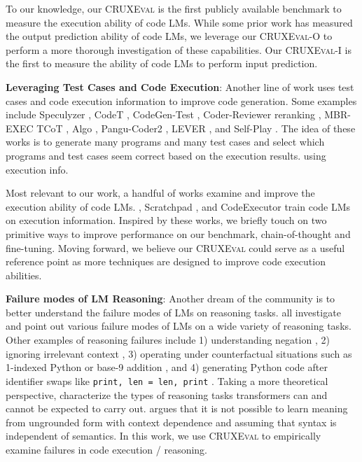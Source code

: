 \documentclass{article} %
\newcommand{\benchmark}{\textsc{CRUXEval}\xspace}
\newcommand{\benchmarki}{\textsc{CRUXEval-I}\xspace}
\newcommand{\benchmarko}{\textsc{CRUXEval-O}\xspace}
\begin{document}
To our knowledge, our \benchmark is the first publicly available benchmark to measure the execution ability of code LMs. While some prior work has measured the output prediction ability of code LMs, we leverage our \benchmarko to perform a more thorough investigation of these capabilities. Our \benchmarki is the first to measure the ability of code LMs to perform input prediction.

\textbf{Leveraging Test Cases and Code Execution}: Another line of work uses test cases and code execution information to improve code generation. Some examples include Speculyzer \citep{key2022speak}, CodeT \citep{chen2022codet}, CodeGen-Test \citep{zhong2022codegen}, Coder-Reviewer reranking \citep{zhang2023coder}, MBR-EXEC \citep{shi2022natural}
TCoT \citep{tian2023test},
Algo \citep{zhang2023algo}, Pangu-Coder2 \citep{shen2023pangu}, LEVER \cite{ni2023lever}, and Self-Play \citep{haluptzok2022language}.
The idea of these works is to generate many programs and many test cases and select which programs and test cases seem correct based on the execution results. 
using execution info. 

Most relevant to our work, a handful of works examine and improve the execution ability of code LMs. \cite{austin2021program}, 
Scratchpad \citep{nye2021show}, and CodeExecutor \citep{liu2023code} train code LMs on execution information. Inspired by these works, we briefly touch on two primitive ways to improve performance on our benchmark, chain-of-thought and fine-tuning. Moving forward, we believe our \benchmark could serve as a useful reference point as more techniques are designed to improve code execution abilities.

\textbf{Failure modes of LM Reasoning}: Another dream of the community is to better understand the failure modes of LMs on reasoning tasks. \cite{bubeck2023sparks, liu2023evaluating, arkoudas2023gpt, zhang2022paradox, dziri2023faith, olausson2023linc, lee2023teaching, zhang2023can} all investigate and point out various failure modes of LMs on a wide variety of reasoning tasks. Other examples of reasoning failures include 1) understanding negation \citep{hosseini2021understanding}, 2) ignoring irrelevant context \citep{shi2023large}, 3) operating under counterfactual situations such as 1-indexed Python or base-9 addition \citep{wu2023reasoning}, and 4) generating Python code after identifier swaps like \texttt{print, len = len, print} \citep{miceli2023larger}. Taking a more theoretical perspective, \cite{dziri2023faith, zhou2023algorithms, merrill2023expresssive, giannou2023looped} characterize the types of reasoning tasks transformers can and cannot be expected to carry out.
\cite{merrill2021provable} argues that it is not possible to learn meaning from ungrounded form with context dependence and assuming that syntax is independent of semantics. 
In this work, we use \benchmark to empirically examine failures in code execution / reasoning. 
\end{document}
